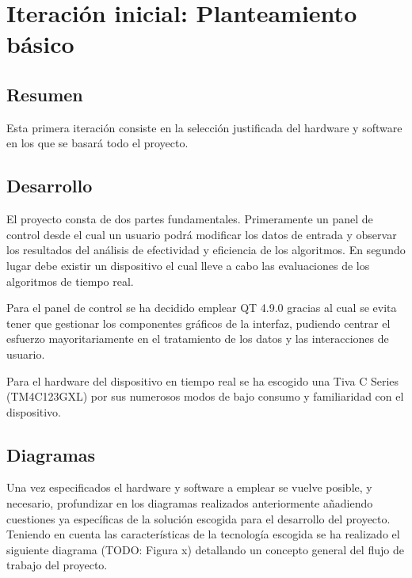 
\section{Iteración inicial: Planteamiento básico}
        \subsection{Resumen}
        
        Esta primera iteración consiste en la selección justificada del hardware y software en los que se basará todo el proyecto.
        
        \subsection{Desarrollo}

        El proyecto consta de dos partes fundamentales. Primeramente un panel de control desde el cual un usuario podrá modificar los datos de entrada y observar los resultados del análisis de efectividad y eficiencia de los algoritmos. En segundo lugar debe existir un dispositivo el cual lleve a cabo las evaluaciones de los algoritmos de tiempo real.

        Para el panel de control se ha decidido emplear QT 4.9.0 gracias al cual se evita tener que gestionar los componentes gráficos de la interfaz, pudiendo centrar el esfuerzo mayoritariamente en el tratamiento de los datos y las interacciones de usuario.
        
        Para el hardware del dispositivo en tiempo real se ha escogido una Tiva C Series (TM4C123GXL) por sus numerosos modos de bajo consumo y familiaridad con el dispositivo.        

        \subsection{Diagramas}

        Una vez especificados el hardware y software a emplear se vuelve posible, y necesario, profundizar en los diagramas realizados anteriormente añadiendo cuestiones ya específicas de la solución escogida para el desarrollo del proyecto. Teniendo en cuenta las características de la tecnología escogida se ha realizado el siguiente diagrama (TODO: Figura x) detallando un concepto general del flujo de trabajo del proyecto.

